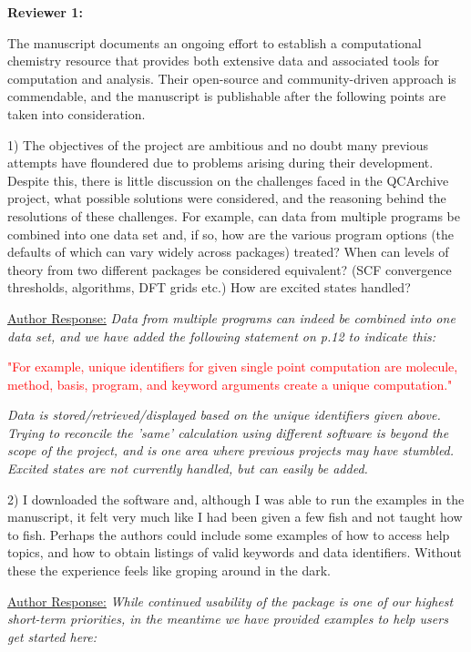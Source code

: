 \documentclass[12pt]{article}
\begin{document}
\noindent
\textbf{Reviewer 1:}

The manuscript documents an ongoing effort to establish a computational
chemistry resource that provides both extensive data and associated tools for 
computation and analysis.  Their open-source and community-driven approach is
commendable, and the manuscript is publishable after the following points are
taken into consideration.

1) The objectives of the project are ambitious and no doubt many previous
attempts have floundered due to problems arising during their development.
Despite this, there is little discussion on the challenges faced in the 
QCArchive project, what possible solutions were considered, and the reasoning
behind the resolutions of these challenges.  For example, can data from
multiple programs be combined into one data set and, if so, how are the various
program options (the defaults of which can vary widely across packages) treated?
When can levels of theory from two different packages be considered equivalent?
(SCF convergence thresholds, algorithms, DFT grids etc.)  How are excited
states handled?

\noindent \underline{Author Response:} \textit{Data from multiple programs can
indeed be combined into one data set, and we have added the following
statement on p.12 to indicate this:}

\noindent \textcolor{red}{"For example, unique identifiers for given single
point computation are molecule, method, basis, program, and keyword arguments
create a unique computation."}

\noindent
\textit{Data is stored/retrieved/displayed based
on the unique identifiers given above. Trying to reconcile the 'same'
calculation using different software is beyond the scope of the project, and
is one area where previous projects may have stumbled. Excited states are not
currently handled, but can easily be added.}

2) I downloaded the software and, although I was able to run the examples in the 
manuscript, it felt very much like I had been given a few fish and not taught
how to fish.  Perhaps the authors could include some examples of how to access
help topics, and how to obtain listings of valid keywords and data identifiers.
Without these the experience feels like groping around in the dark.

\noindent \underline{Author Response:} \textit{While continued usability of
the package is one of our highest short-term priorities, in the meantime we
have provided examples to help users get started here:}
\end{document}
